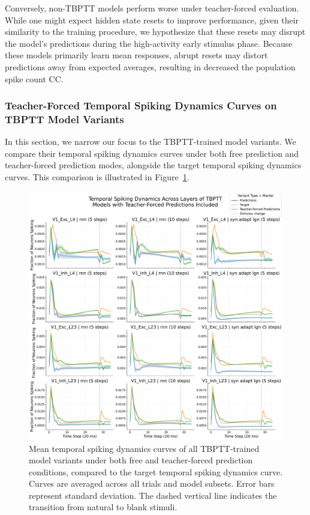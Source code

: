 Conversely, non-TBPTT models perform worse under teacher-forced evaluation. While one might expect hidden state resets to improve performance, given their similarity to the training procedure, we hypothesize that these resets may disrupt the model's predictions during the high-activity early stimulus phase. Because these models primarily learn mean responses, abrupt resets may distort predictions away from expected averages, resulting in decreased the population spike count CC.


\subsubsection{Teacher-Forced Temporal Spiking Dynamics Curves on TBPTT Model Variants}
\label{subsubsec:teacher_forced_synchrony_curves_tbptt}
In this section, we narrow our focus to the TBPTT-trained model variants. We compare their temporal spiking dynamics curves under both free prediction and teacher-forced prediction modes, alongside the target temporal spiking dynamics curves. This comparison is illustrated in Figure~\ref{fig:free_vs_teacher_forced_synchrony}.

\begin{figure}
    \centering
    \includegraphics[width=\linewidth]{img/plots/tbptt_models_forced_included_model_synchrony_curve.pdf}
    \caption{Mean temporal spiking dynamics curves of all TBPTT-trained model variants under both free and teacher-forced prediction conditions, compared to the target temporal spiking dynamics curve. Curves are averaged across all trials and model subsets. Error bars represent standard deviation. The dashed vertical line indicates the transition from natural to blank stimuli.}
    \label{fig:free_vs_teacher_forced_synchrony}
\end{figure}

